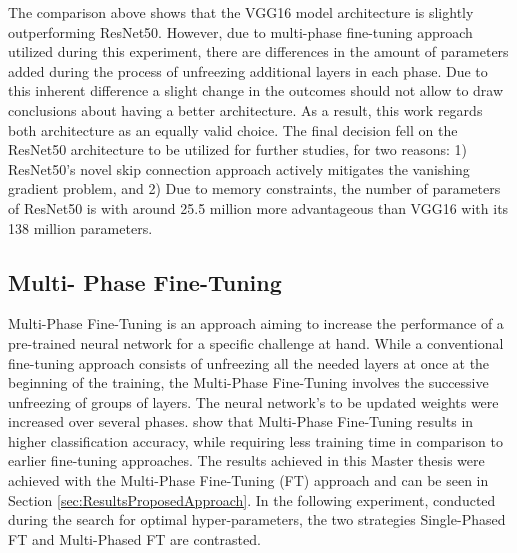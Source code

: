 The comparison above shows that the VGG16 model architecture is slightly outperforming ResNet50. However, due to multi-phase fine-tuning approach utilized during this experiment, there are differences in the amount of parameters added during the process of unfreezing additional layers in each phase. Due to this inherent difference a slight change in the outcomes should not allow to draw conclusions about having a better architecture. As a result, this work regards both architecture as an equally valid choice. 
\newline\newline
The final decision fell on the ResNet50 architecture to be utilized for further studies, for two reasons: 1) ResNet50's novel skip connection approach actively mitigates the vanishing gradient problem, and 2) Due to memory constraints, the number of parameters of ResNet50 is with around 25.5 million more advantageous than VGG16 with its 138 million parameters.


\subsection{Multi- Phase Fine-Tuning}
Multi-Phase Fine-Tuning is an approach aiming to increase the performance of a pre-trained neural network for a specific challenge at hand. While a conventional fine-tuning approach consists of unfreezing all the needed layers at once at the beginning of the training, the Multi-Phase Fine-Tuning involves the successive unfreezing of groups of layers. The neural network's to be updated weights were increased over several phases. \citet{Sarhan:2020:MultiPhaseFineTuning} show that Multi-Phase Fine-Tuning results in higher classification accuracy, while requiring less training time in comparison to earlier fine-tuning approaches.
\newline\newline
The results achieved in this Master thesis were achieved with the Multi-Phase Fine-Tuning (FT) approach and can be seen in Section \ref{sec:ResultsProposedApproach}. In the following experiment, conducted during the search for optimal hyper-parameters, the two strategies Single-Phased FT and Multi-Phased FT are contrasted.

